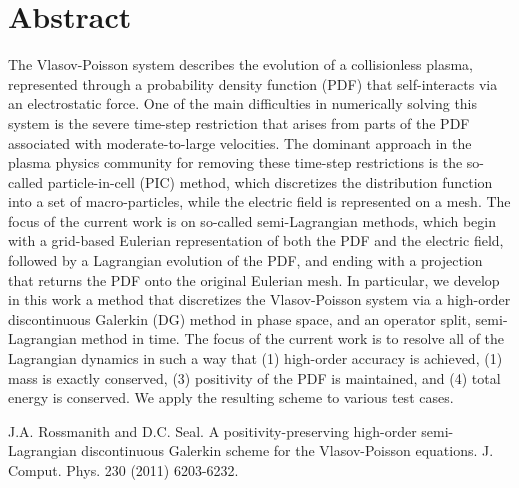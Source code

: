 \documentclass[article, A4, 11pt]{llncs}%
\begin{document}
\section*{Abstract}
The Vlasov-Poisson system describes the evolution of a collisionless plasma, represented through a probability density function (PDF) that self-interacts via an electrostatic force. One of the main difficulties in numerically solving this system is the severe time-step restriction that arises from parts of the PDF associated with moderate-to-large velocities. The dominant approach in the plasma physics community for removing these time-step restrictions is the so-called particle-in-cell (PIC) method, which discretizes the distribution function into a set of macro-particles, while the electric field is represented on a mesh. The focus of the current work is on so-called semi-Lagrangian methods, which begin with a grid-based Eulerian representation of both the PDF and the electric field, followed by a Lagrangian evolution of the PDF, and ending with a projection that returns the PDF onto the original Eulerian mesh. In particular, we develop in this work a method that discretizes the Vlasov-Poisson system via a high-order discontinuous Galerkin (DG) method in phase space, and an operator split, semi-Lagrangian method in time. The focus of the current work is to resolve all of the Lagrangian dynamics in such a way that (1) high-order accuracy is achieved, (1) mass is exactly conserved, (3) positivity of the PDF is maintained, and (4) total energy is conserved. We apply the resulting scheme to various test cases.


\begin{thebibliography}{10}
{\sc J.A. Rossmanith and D.C. Seal}. { A positivity-preserving high-order semi-Lagrangian discontinuous Galerkin scheme for the Vlasov-Poisson equations}. J. Comput. Phys. 230 (2011) 6203-6232.
\end{thebibliography} %
\end{document}
